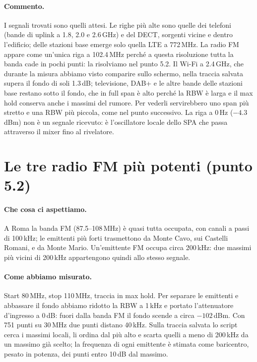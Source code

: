 \documentclass[11pt,a4paper,oneside]{book}
\begin{document}
\paragraph{Commento.} I segnali trovati sono quelli attesi. Le righe più alte sono quelle dei telefoni (bande di uplink a 1.8, 2.0 e 2.6\,GHz) e del DECT, sorgenti vicine e dentro l'edificio; delle stazioni base emerge solo quella LTE a 772\,MHz. La radio FM appare come un'unica riga a 102.4\,MHz perché a questa risoluzione tutta la banda cade in pochi punti: la risolviamo nel punto 5.2. Il Wi-Fi a 2.4\,GHz, che durante la misura abbiamo visto comparire sullo schermo, nella traccia salvata supera il fondo di soli 1.3\,dB; televisione, DAB+ e le altre bande delle stazioni base restano sotto il fondo, che in full span è alto perché la RBW è larga e il max hold conserva anche i massimi del rumore. Per vederli servirebbero uno span più stretto e una RBW più piccola, come nel punto successivo. La riga a 0\,Hz ($-4.3$\,dBm) non è un segnale ricevuto: è l'oscillatore locale dello SPA che passa attraverso il mixer fino al rivelatore.

\section{Le tre radio FM più potenti (punto 5.2)}
\label{sec:5_2}

\paragraph{Che cosa ci aspettiamo.} A Roma la banda FM (87.5--108\,MHz) è quasi tutta occupata, con canali a passi di 100\,kHz; le emittenti più forti trasmettono da Monte Cavo, sui Castelli Romani, e da Monte Mario. Un'emittente FM occupa circa 200\,kHz: due massimi più vicini di 200\,kHz appartengono quindi allo stesso segnale.

\paragraph{Come abbiamo misurato.} Start 80\,MHz, stop 110\,MHz, traccia in max hold. Per separare le emittenti e abbassare il fondo abbiamo ridotto la RBW a 1\,kHz e portato l'attenuatore d'ingresso a 0\,dB: fuori dalla banda FM il fondo scende a circa $-102$\,dBm. Con 751 punti su 30\,MHz due punti distano 40\,kHz. Sulla traccia salvata lo script cerca i massimi locali, li ordina dal più alto e scarta quelli a meno di 200\,kHz da un massimo già scelto; la frequenza di ogni emittente è stimata come baricentro, pesato in potenza, dei punti entro 10\,dB dal massimo.
\end{document}
